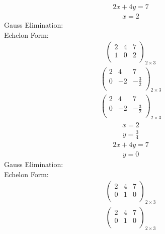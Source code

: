 \documentclass{article}
\begin{document}
\begin{align*}
2x + 4y=7\end{align*}
\begin{align*}
x=2\end{align*}
Gauss Elimination:\\
Echelon Form:\\
\begin{align*}
\left(
\begin{array}{cc|c}
2 & 4 & 7\\
1 & 0 & 2\\
\end{array}
\right)_{2\times 3}
\end{align*}
\begin{align*}
\left(
\begin{array}{cc|c}
2 & 4 & 7\\
0 & -2 & -\frac{3}{2}\\
\end{array}
\right)_{2\times 3}
\end{align*}
\begin{align*}
\left(
\begin{array}{cc|c}
2 & 4 & 7\\
0 & -2 & -\frac{3}{2}\\
\end{array}
\right)_{2\times 3}
\end{align*}
\begin{align*}
x=2\end{align*}
\begin{align*}
y=\frac{3}{4}\end{align*}
\begin{align*}
2x + 4y=7\end{align*}
\begin{align*}
y=0\end{align*}
Gauss Elimination:\\
Echelon Form:\\
\begin{align*}
\left(
\begin{array}{cc|c}
2 & 4 & 7\\
0 & 1 & 0\\
\end{array}
\right)_{2\times 3}
\end{align*}
\begin{align*}
\left(
\begin{array}{cc|c}
2 & 4 & 7\\
0 & 1 & 0\\
\end{array}
\right)_{2\times 3}
\end{align*}
\end{document}
